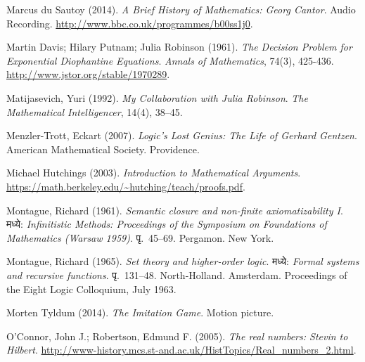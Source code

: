 \par\medskip{}\label{bib:Sautoy2014}
Marcus du Sautoy (2014). \emph{{A} Brief History of Mathematics: {G}eorg {C}antor}. Audio Recording. \url{http://www.bbc.co.uk/programmes/b00ss1j0}.

\par\medskip{}\label{bib:DavisPutnamRobinson1961}
Martin Davis; Hilary Putnam; Julia Robinson (1961). \emph{The Decision Problem for Exponential {D}iophantine Equations}. \emph{Annals of Mathematics}, 74(3), 425-436. \url{http://www.jstor.org/stable/1970289}.

\par\medskip{}\label{bib:Matijasevich1992}
Matijasevich, Yuri (1992). \emph{My Collaboration with {J}ulia {R}obinson}. \emph{The Mathematical Intelligencer}, 14(4), 38--45.

\par\medskip{}\label{bib:Menzler-Trott2007}
Menzler-Trott, Eckart (2007). \emph{Logic's Lost Genius: The Life of {G}erhard {G}entzen}. American Mathematical Society. Providence.

\par\medskip{}\label{bib:Hutchings2003}
Michael Hutchings (2003). \emph{Introduction to Mathematical Arguments}. \url{https://math.berkeley.edu/~hutching/teach/proofs.pdf}.

\par\medskip{}\label{bib:Montague1961}
Montague, Richard (1961). \emph{Semantic closure and non-finite axiomatizability {I}}. मध्ये: \emph{Infinitistic Methods: Proceedings of the Symposium on Foundations of Mathematics (Warsaw 1959)}. पृ.~45--69. Pergamon. New York.

\par\medskip{}\label{bib:Montague1965}
Montague, Richard (1965). \emph{Set theory and higher-order logic}. मध्ये: \emph{Formal systems and recursive functions}. पृ.~131--48. North-Holland. Amsterdam. Proceedings of the Eight Logic Colloquium, July 1963.

\par\medskip{}\label{bib:Imitation2014}
Morten Tyldum (2014). \emph{The Imitation Game}. Motion picture.

\par\medskip{}\label{bib:OConnorRobertson:RN}
O'Connor, John J.; Robertson, Edmund F. (2005). \emph{The real numbers: {Stevin} to {Hilbert}}. \url{http://www-history.mcs.st-and.ac.uk/HistTopics/Real_numbers_2.html}.

